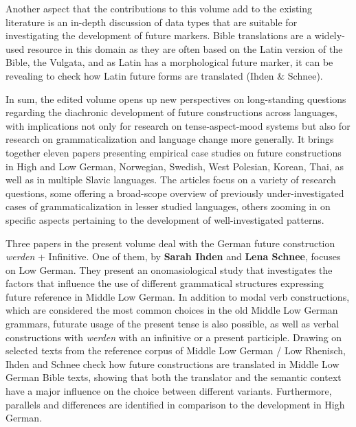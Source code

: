 \documentclass[output=paper,colorlinks,citecolor=brown]{langscibook}
\begin{document}
Another aspect that the contributions to this volume add to the existing literature is an in-depth discussion of data types that are suitable for investigating the development of future markers. Bible translations are a widely-used resource in this domain as they are often based on the Latin version of the Bible, the Vulgata, and as Latin has a morphological future marker, it can be revealing to check how Latin future forms are translated (Ihden \& Schnee). 

In sum, the edited volume opens up new perspectives on long-standing questions regarding the diachronic development of future constructions across languages, with implications not only for research on tense-aspect-mood systems but also for research on grammaticalization and language change more generally. It brings together eleven papers presenting empirical case studies on future constructions in High and Low German, Norwegian, Swedish, West Polesian, Korean, Thai, as well as in multiple Slavic languages. The articles focus on a variety of research questions, some offering a broad-scope overview of previously under-investigated cases of grammaticalization in lesser studied languages, others zooming in on specific aspects pertaining to the development of well-investigated patterns. 

Three papers in the present volume deal with the German future construction \textit{werden} + Infinitive. One of them, by \textbf{Sarah Ihden} and \textbf{Lena Schnee}, focuses on Low German. They present an onomasiological study that investigates the factors that influence the use of different grammatical structures expressing future reference in Middle Low German. In addition to modal verb constructions, which are considered the most common choices in the old Middle Low German grammars, futurate usage of the present tense is also possible, as well as verbal constructions with \textit{werden} with an infinitive or a present participle. Drawing on selected texts from the reference corpus of Middle Low German / Low Rhenisch, Ihden and Schnee check how future constructions are translated in Middle Low German Bible texts, showing that both the translator and the semantic context have a major influence on the choice between different variants. Furthermore, parallels and differences are identified in comparison to the development in High German. 
\end{document}

